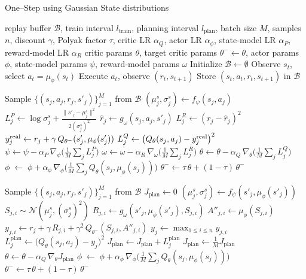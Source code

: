 \documentclass[11pt,a4paper]{report}
\begin{document}
\begin{algorithm}[ht]
\caption{One–Step using Gaussian State distributions}
\label{alg:one_step_det_reward_separate}
\begin{algorithmic}[1]
\Require 
  replay buffer $\mathcal B$, train interval $l_{\text{train}}$, planning interval $l_{\text{plan}}$, batch size $M$, samples $n$, discount $\gamma$, Polyak factor $\tau$,  
  critic LR $\alpha_Q$, actor LR $\alpha_\phi$,  
  state‐model LR $\alpha_P$, reward‐model LR $\alpha_R$
\Ensure 
  critic params $\theta$, target critic params $\theta^-\!\gets\theta$, actor params $\phi$,  
  state‐model params $\psi$, reward‐model params $\omega$
\State Initialize $\mathcal B\gets\emptyset$
  \State Observe $s_t$, select $a_t=\mu_\phi(s_t)$
  \State Execute $a_t$, observe $(r_t,s_{t+1})$
  \State Store $(s_t,a_t,r_t,s_{t+1})$ in $\mathcal B$
  
   
    \State Sample $\{(s_j,a_j,r_j,s'_j)\}_{j=1}^M$ from $\mathcal B$
      \State $(\mu^s_j,\sigma^s_j)\gets f_\psi(s_j,a_j)$
      \State $L^P_j \gets \log\sigma^s_j + \frac{\|s'_j-\mu^s_j\|^2}{2(\sigma^s_j)^2}$
      \State $\hat r_j \gets g_\omega(s_j,a_j,s'_j)$
      \State $L^R_j \gets (r_j - \hat r_j)^2$
      \State $y^{\rm real}_j \gets r_j + \gamma\,Q_{\theta^-}(s'_j,\mu_\phi(s'_j))$
      \State $L^Q_j \gets \bigl(Q_\theta(s_j,a_j) - y^{\rm real}_j\bigr)^2$
    \EndFor
    \State $\psi \!\gets\! \psi - \alpha_P\,\nabla_\psi\bigl(\tfrac{1}{M}\sum_j L^P_j\bigr)$
    \State $\omega \!\gets\! \omega - \alpha_R\,\nabla_\omega\bigl(\tfrac{1}{M}\sum_j L^R_j\bigr)$
    \State $\theta \!\gets\! \theta - \alpha_Q\,\nabla_\theta\bigl(\tfrac{1}{M}\sum_j L^Q_j\bigr)$
    \State $\phi \;\gets\;\phi + \alpha_\phi\,\nabla_\phi\bigl(\tfrac{1}{M}\sum_j Q_\theta(s_j,\mu_\phi(s_j))\bigr)$
    \State $\theta^- \!\gets\! \tau\,\theta + (1-\tau)\,\theta^-$
  \EndIf
  
   
    \State Sample $\{(s_j,a_j,r_j,s'_j)\}_{j=1}^M$ from $\mathcal B$
    \State $J_{\text{plan}}\gets 0$
      \State $(\mu^s_j{},\sigma^s_j)\gets f_\psi(s'_j,\mu_\phi(s'_j))$
        \State $S_{j,i}\sim\mathcal N(\mu^s_j,(\sigma^s_j)^2)$
        \State $R_{j,i}\gets g_\omega(s'_j,\mu_\phi(s'_j),S_{j,i})$
        \State $A''_{j,i}\gets \mu_\phi(S_{j,i})$
        \State $y_{j,i}\gets r_j + \gamma\,R_{j,i} + \gamma^2\,Q_{\theta^-}(S_{j,i},A''_{j,i})$
      \EndFor
      \State $y_j\gets \max_{1\le i\le n} y_{j,i}$
      \State $L^{\text{plan}}_j \gets \bigl(Q_\theta(s_j,a_j) - y_j\bigr)^2$
      \State $J_{\text{plan}}\gets J_{\text{plan}} + L^{\text{plan}}_j$
    \EndFor
    \State $J_{\text{plan}}\gets \tfrac{1}{M}J_{\text{plan}}$
    \State $\theta \!\gets\! \theta - \alpha_Q\,\nabla_\theta J_{\text{plan}}$
    \State $\phi \;\gets\;\phi + \alpha_\phi\,\nabla_\phi\bigl(\tfrac{1}{M}\sum_j Q_\theta(s_j,\mu_\phi(s_j))\bigr)$
    \State $\theta^- \!\gets\! \tau\,\theta + (1-\tau)\,\theta^-$
  \EndIf
\EndFor
\end{algorithmic}
\end{algorithm}
\end{document}
